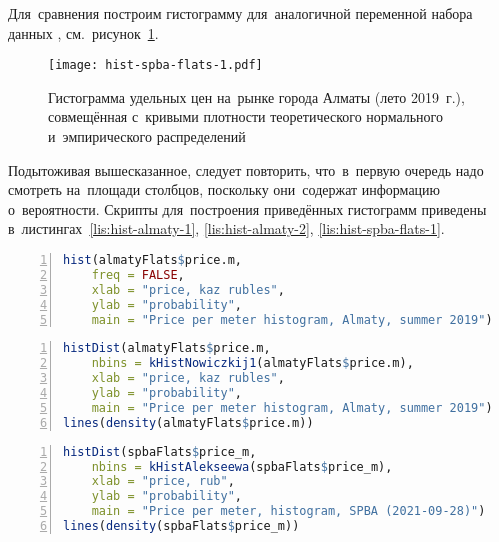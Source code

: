 \documentclass[]{scrartcl}
\begin{document}
Для~сравнения построим гистограмму для~аналогичной переменной набора данных \cite{ds:spba-flats-210928}, см.~рисунок~\ref{fig:hist-spba-flats-1}.

\begin{figure}[ht]
	\centering %
	\texttt{[image: hist-spba-flats-1.pdf]}
	\caption{Гистограмма удельных цен на~рынке города Алматы (лето 2019~г.), совмещённая с~кривыми плотности теоретического нормального и~эмпирического распределений}\label{fig:hist-spba-flats-1}
\end{figure}
Подытоживая вышесказанное, следует повторить, что~в~первую очередь надо смотреть на~площади столбцов, поскольку они~содержат информацию о~вероятности.
Скрипты для~построения приведённых гистограмм приведены в~листингах~\ref{lis:hist-almaty-1}, \ref{lis:hist-almaty-2}, \ref{lis:hist-spba-flats-1}.  

\begin{lstlisting}[float, caption = Построение простой гистограммы для~г.~Алматы, firstnumber=1, language = R, firstnumber=1, numbers=left, numberstyle=\tiny, stepnumber=2, numbersep=5pt, label= lis:hist-almaty-1]
hist(almatyFlats$price.m,
	freq = FALSE,
	xlab = "price, kaz rubles",
	ylab = "probability",
	main = "Price per meter histogram, Almaty, summer 2019")
\end{lstlisting}

\begin{lstlisting}[float, caption = Построение гистограммы\, совмещённой с~кривыми плотности теоретического нормального и~эмпирического распределений для~г.~Алматы, firstnumber=1, language = R, firstnumber=1, numbers=left, numberstyle=\tiny, stepnumber=2, numbersep=5pt, label= lis:hist-almaty-2]
histDist(almatyFlats$price.m,
 	nbins = kHistNowiczkij1(almatyFlats$price.m),
	xlab = "price, kaz rubles",
	ylab = "probability",
	main = "Price per meter histogram, Almaty, summer 2019")
lines(density(almatyFlats$price.m))
\end{lstlisting}

\begin{lstlisting}[float, caption = Построение гистограммы\, совмещённой с~кривыми плотности теоретического нормального и~эмпирического распределений для~городской агломерации Санкт-Петербург, firstnumber=1, language = R, firstnumber=1, numbers=left, numberstyle=\tiny, stepnumber=2, numbersep=5pt, label= lis:hist-spba-flats-1]
histDist(spbaFlats$price_m,
	nbins = kHistAlekseewa(spbaFlats$price_m),
	xlab = "price, rub",
	ylab = "probability",
	main = "Price per meter, histogram, SPBA (2021-09-28)")  
lines(density(spbaFlats$price_m))
\end{lstlisting}
\end{document}
